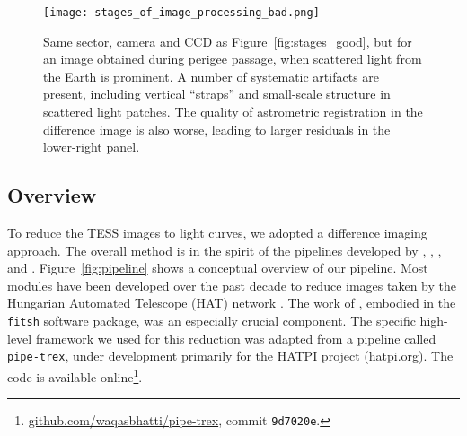 \documentclass[12pt,twocolumn,tighten]{aastex62}
\begin{document}
\begin{figure}[!t]
    \begin{center}
        \leavevmode
        \texttt{[image: stages\_of\_image\_processing\_bad.png]}
    \end{center}
    \vspace{-0.7cm}
    \caption{
        Same sector, camera and CCD as Figure~\ref{fig:stages_good},
        but for an image obtained during perigee passage, when
        scattered light from the Earth is prominent.  A number of
        systematic artifacts are present, including vertical
        ``straps'' and small-scale structure in scattered light
        patches.  The quality of astrometric registration in the
        difference image is also worse, leading to larger residuals in
        the lower-right panel.
        \label{fig:stages_bad}
    }
\end{figure}

\subsection{Overview}

To reduce the TESS images to light curves, we adopted a difference
imaging approach.  The overall method is in the spirit of the
pipelines developed by \citet{Pal_2009},
\citet{huang_high-precision_2015}, \citet{soares-furtado_image_2017},
\citet{oelkers_precision_2018} and \citet{wallace_search_2019}.
Figure~\ref{fig:pipeline} shows a conceptual overview of our pipeline.
Most modules have been developed over the past decade to reduce images
taken by the Hungarian Automated Telescope (HAT) network
\citep{bakos_hat_review_2018}.  The work of \citet{Pal_2009}, embodied
in the \texttt{fitsh} software package, was an especially crucial
component.  The specific high-level framework we used for this
reduction was adapted from a pipeline called \texttt{pipe-trex}, under
development primarily for the HATPI project (\url{hatpi.org}).  The
code is available
online\footnote{\url{github.com/waqasbhatti/pipe-trex}, commit
\texttt{9d7020e}.}.
\end{document}
